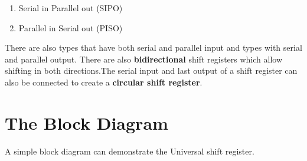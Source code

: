 \documentclass{article}
\begin{document}
\begin{enumerate}
\item Serial in Parallel out (SIPO)
\item Parallel in Serial out (PISO)
\end{enumerate}
\begin{flushleft}
There are also types that have both serial and parallel input and types with serial and parallel output. There are also \textbf{bidirectional} shift registers which allow shifting in both directions.The serial input and last output of a shift register can also be connected to create a \textbf{circular shift register}.
\newpage
\section{The Block Diagram}
A simple block diagram can demonstrate the Universal shift register.\\
\smallskip
\begin{figure}[!h]


\begin{tikzpicture}[x=0.75pt,y=0.75pt,yscale=-1,xscale=1]


\end{tikzpicture}
\end{figure}
\end{flushleft}
\end{document}
